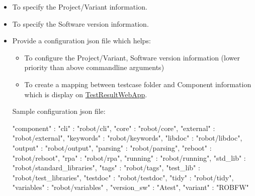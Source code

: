 \begin{itemize}
\item {}

  To specify the {Project/Variant} information.

\item {}

  To specify the {Software version} information.

\item {}

  Provide a configuration json file  which helps:

  \begin{itemize}
  \item To configure the {Project/Variant}, {Software version} information
    (lower priority than above commandline arguments)

  \item To create a mapping between testcase folder and {Component}
    information which is display on
    \href{https://github.com/test-fullautomation/testresultwebapp}{TestResultWebApp}.
  \end{itemize}

  Sample configuration json file:

\begin{pythoncode}
{
   "component"  : {
                  "cli"       : "robot/cli",
                  "core"      : "robot/core",
                  "external"  : "robot/external",
                  "keywords"  : "robot/keywords",
                  "libdoc"    : "robot/libdoc",
                  "output"    : "robot/output",
                  "parsing"   : "robot/parsing",
                  "reboot"    : "robot/reboot",
                  "rpa"       : "robot/rpa",
                  "running"   : "robot/running",
                  "std_lib"   : "robot/standard_libraries",
                  "tags"      : "robot/tags",
                  "test_lib"  : "robot/test_libraries",
                  "testdoc"   : "robot/testdoc",
                  "tidy"      : "robot/tidy",
                  "variables" : "robot/variables"
   },
   "version_sw" : "Atest",
   "variant"    : "ROBFW"
}
\end{pythoncode}
\end{itemize}
